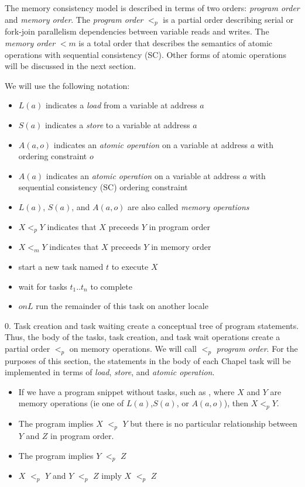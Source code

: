 The memory consistency model is described in terms of two orders: \textit{program order} and \textit{memory order}. The \textit{program order} $<_p$ is a partial order describing serial or fork-join parallelism dependencies between variable reads and writes. The \textit{memory order} $<m$ is a total order that describes the semantics of atomic operations with sequential consistency (SC). Other forms of atomic operations will be discussed in the next section.

We will use the following notation:
\begin{itemize}
  \item $L(a)$ indicates a \textit{load} from a variable at address $a$
  \item $S(a)$ indicates a \textit{store} to a variable at address $a$
  \item $A(a,o)$ indicates an \textit{atomic operation} on a variable at address $a$ with ordering constraint $o$
  \item $A(a)$ indicates an \textit{atomic operation} on a variable at address $a$ with sequential consistency (SC) ordering constraint
  \item $L(a)$, $S(a)$, and $A(a,o)$ are also called \textit{memory operations}
  \item $X <_p Y$ indicates that $X$ preceeds $Y$ in program order
  \item $X <_m Y$ indicates that $X$ preceeds $Y$ in memory order
  \item {} start a new task named $t$ to execute $X$
  \item {} wait for tasks $t_1..t_n$ to complete
  \item $on L$ run the remainder of this task on another locale
\end{itemize}

0. Task creation and task waiting create a conceptual tree of program
statements. Thus, the body of the tasks, task creation, and task wait
operations create a partial order $<_p$ on memory operations. We will call
$<_p$ \textit{program order}. For the purposes of this section, the statements
in the body of each Chapel task will be implemented in terms of \textit{load},
\textit{store}, and \textit{atomic operation}.

\begin{itemize}
  \item If we have a program snippet without tasks, such as , where $X$ and $Y$ are memory operations (ie one of $L(a)$,$S(a)$, or $A(a,o)$), then $X <_p Y$.
  \item The program  implies $X$ $<_p$ $Y$ but there is no particular relationship between $Y$ and $Z$ in program order.
  \item The program  implies $Y$ $<_p$ $Z$
  \item $X$ $<_p$ $Y$ and $Y$ $<_p$ $Z$ imply $X$ $<_p$ $Z$
\end{itemize}

